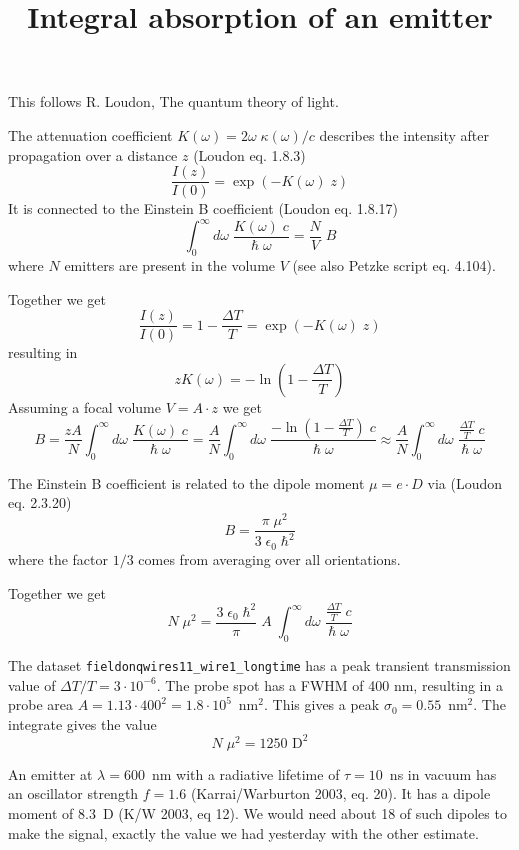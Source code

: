 \documentclass[a4paper,10pt]{article}
\title{Integral absorption of an emitter}
\author{}
\begin{document}
\maketitle

\pagestyle{empty}
\thispagestyle{empty}

This follows R. Loudon, The quantum theory of light.

The attenuation coefficient $K(\omega) = 2\omega \; \kappa(\omega) /c$
describes the intensity after propagation over a distance $z$ (Loudon eq. 1.8.3)
\[
 \frac{I(z)}{I(0)} = \exp \left( - K (\omega) \; z \right)
\]
It is connected to the Einstein B coefficient (Loudon eq. 1.8.17)
\[
 \int_0^{\infty} d\omega \; \frac{K(\omega) \; c}{\hbar \; \omega} =
\frac{N}{V} \; B
\]
where $N$ emitters are present in the volume $V$ (see also Petzke
script eq. 4.104).

Together we get
\[
  \frac{I(z)}{I(0)} = 1 - \frac{\Delta T}{T} = \exp \left( - K (\omega) \; z
\right)
\]
resulting in
\[
z K(\omega) = -   \ln \left(  1 - \frac{\Delta T}{T} \right)
\]
Assuming a focal volume   $V = A \cdot z$ we get
\[
 B = \frac{z A}{N}   \int_0^{\infty} d\omega \; \frac{K(\omega) \; c}{\hbar \;
\omega} 
 = \frac{ A}{N} \int_0^{\infty} d\omega \; \frac{-\ln \left(  1 - \frac{\Delta
T}{T} \right)  \; c}{\hbar \; \omega}
%
\approx 
    \frac{ A}{N} \int_0^{\infty} d\omega \; \frac{  \frac{\Delta
T}{T}    \; c}{\hbar \; \omega}
\]




The Einstein B coefficient is related to the dipole moment $\mu = e \cdot D$ via
 (Loudon eq. 2.3.20)
\[
 B = \frac{\pi \; \mu^2}{3 \; \epsilon_0 \; \hbar^2}
\]
where the factor $1/3$ comes from averaging over all orientations.

Together we get 
\[
 N \; \mu^2 =   \frac{3 \; \epsilon_0 \; \hbar^2}{\pi} \; A \;
\int_0^{\infty} d\omega \; \frac{  \frac{\Delta
T}{T}    \; c}{\hbar \; \omega}
\]


The dataset \verb|fieldonqwires11_wire1_longtime| has a peak transient
transmission value of $\Delta T /T = 3 \cdot 10^{-6}$. The probe spot has a FWHM
of 400 nm, resulting in a probe area $A = 1.13 \cdot 400^2 = 1.8 \cdot
10^5$~nm$^2$. This gives a peak $\sigma_0 = 0.55 $~nm$^2$. The integrate gives
the value
\[
 N \; \mu^2 = 1250 \text{ D}^2
\]

An emitter at $\lambda = 600$~nm with a radiative lifetime of $\tau = 10$~ns
in vacuum has an oscillator strength $f=1.6$ (Karrai/Warburton 2003, eq. 20).
It has a dipole moment of 8.3~D (K/W 2003, eq 12). We would need about 18 of
such dipoles to make the signal, exactly the value we had yesterday with the
other estimate.
\end{document}
